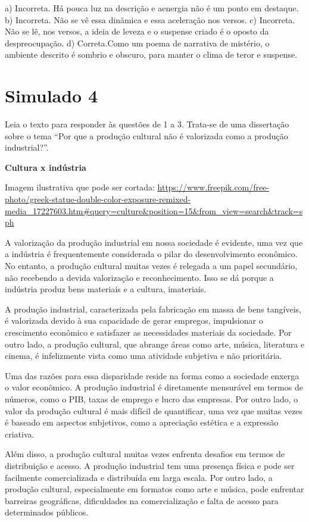 \begin{escolha}
\begin{escolha}
\begin{escolha}
\begin{escolha}
\begin{escolha}
\begin{escolha}
\begin{escolha}
\begin{escolha}
a) Incorreta. Há pouca luz na descrição e aenergia não é um ponto em
destaque. b) Incorreta. Não se vê essa dinãmica e essa aceleração nos
versos. c) Incorreta. Não se lê, nos versos, a ideia de leveza e o
suspense criado é o oposto da despreocupação. d) Correta.Como um poema
de narrativa de mistério, o ambiente descrito é sombrio e obscuro, para
manter o clima de teror e suspense.

\chapter{Simulado 4}

Leia o texto para responder às questões de 1 a 3. Trata-se de uma
dissertação sobre o tema ``Por que a produção cultural não é valorizada
como a produção industrial?''.

\textbf{Cultura x indústria}

Imagem ilustrativa que pode ser cortada:
\url{https://www.freepik.com/free-photo/greek-statue-double-color-exposure-remixed-media_17227603.htm\#query=culture\&position=15\&from_view=search\&track=sph}

A valorização da produção industrial em nossa sociedade é evidente, uma
vez que a indústria é frequentemente considerada o pilar do
desenvolvimento econômico. No entanto, a produção cultural muitas vezes
é relegada a um papel secundário, não recebendo a devida valorização e
reconhecimento. Isso se dá porque a indústria produz bens materiais e a
cultura, imateriais.

A produção industrial, caracterizada pela fabricação em massa de bens
tangíveis, é valorizada devido à sua capacidade de gerar empregos,
impulsionar o crescimento econômico e satisfazer as necessidades
materiais da sociedade. Por outro lado, a produção cultural, que abrange
áreas como arte, música, literatura e cinema, é infelizmente vista como
uma atividade subjetiva e não prioritária.

Uma das razões para essa disparidade reside na forma como a sociedade
enxerga o valor econômico. A produção industrial é diretamente
mensurável em termos de números, como o PIB, taxas de emprego e lucro
das empresas. Por outro lado, o valor da produção cultural é mais
difícil de quantificar, uma vez que muitas vezes é baseado em aspectos
subjetivos, como a apreciação estética e a expressão criativa.

Além disso, a produção cultural muitas vezes enfrenta desafios em termos
de distribuição e acesso. A produção industrial tem uma presença física
e pode ser facilmente comercializada e distribuída em larga escala. Por
outro lado, a produção cultural, especialmente em formatos como arte e
música, pode enfrentar barreiras geográficas, dificuldades na
comercialização e falta de acesso para determinados públicos.


\end{escolha}
\end{escolha}
\end{escolha}
\end{escolha}
\end{escolha}
\end{escolha}
\end{escolha}
\end{escolha}

